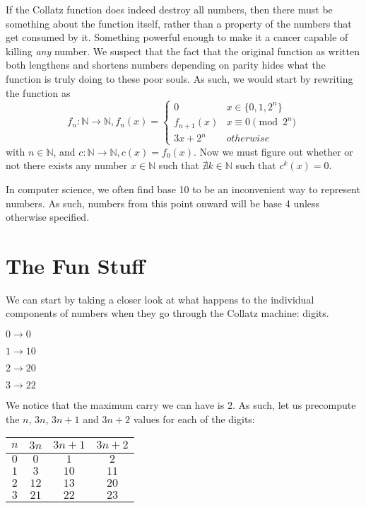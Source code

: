 \documentclass{proc-l}
\theoremstyle{definition}
\theoremstyle{remark}
\numberwithin{equation}{section}
\begin{document}
If the Collatz function does indeed destroy all numbers, then there must be something about the function itself, rather than a property of the numbers that get consumed by it. Something powerful enough to make it a cancer capable of killing \textit{any} number.     
We suspect that the fact that the original function as written both lengthens and shortens numbers depending on parity hides what the function is truly doing to these poor souls. As such, we would start by rewriting the function as 
\[f_{n} : \mathbb{N} \rightarrow \mathbb{N}, 
f_{n}(x) = 
\begin{cases}
0 & x \in \{0, 1, 2^n\} \\
f_{n+1}(x) & x \equiv 0 \pmod {2^n} \\
3x + 2^n & otherwise
\end{cases}
\] with $n \in \mathbb{N}$, and \( c : \mathbb{N} \rightarrow \mathbb{N}, c(x) = f_0(x)\). Now we must figure out whether or not there exists any number $x \in \mathbb{N}$ such that $\nexists k \in \mathbb{N}$ such that $c^k(x) = 0$.

In computer science, we often find base 10 to be an inconvenient way to represent numbers. As such, numbers from this point onward will be base 4 unless otherwise specified.

\section{The Fun Stuff}

We can start by taking a closer look at what happens to the individual components of numbers when they go through the Collatz machine: digits.

$0 \rightarrow 0$

$1 \rightarrow 10$

$2 \rightarrow 20$

$3 \rightarrow 22$

We notice that the maximum carry we can have is $2$. As such, let us precompute the $n$, $3n$, $3n+1$ and $3n+2$ values for each of the digits:

\begin{center}
\begin{tabular}{||c c c c||}
\hline
$n$ & $3n$ & $3n + 1$ & $3n + 2$ \\ [0.5ex]
\hline
\hline
$0$ & $0$ & $1$ & $2$\\
\hline
$1$ & $3$ & $10$ & $11$\\
\hline
$2$ & $12$ & $13$ & $20$\\
\hline
$3$ & $21$ & $22$ & $23$\\
\hline
\end{tabular}
\end{center}
\end{document}
